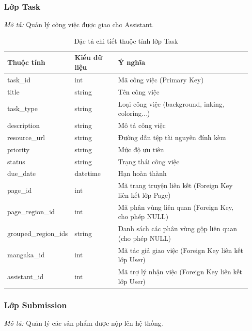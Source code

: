 \subsubsection{Lớp Task}
\textit{Mô tả:} Quản lý công việc được giao cho Assistant.

\begin{table}[H]
\centering
\renewcommand{\arraystretch}{1.3}
\begin{tabularx}{\textwidth}{|p{4cm}|p{3cm}|>{\raggedright\arraybackslash}X|}
\hline
\rowcolor{tableheader}
\textbf{Thuộc tính} & \textbf{Kiểu dữ liệu} & \textbf{Ý nghĩa} \\ \hline
task\_id & int & Mã công việc (Primary Key) \\ \hline
title & string & Tên công việc \\ \hline
task\_type & string & Loại công việc (background, inking, coloring...) \\ \hline
description & string & Mô tả công việc \\ \hline
resource\_url & string & Đường dẫn tệp tài nguyên đính kèm \\ \hline
priority & string & Mức độ ưu tiên \\ \hline
status & string & Trạng thái công việc \\ \hline
due\_date & datetime & Hạn hoàn thành \\ \hline
page\_id & int & Mã trang truyện liên kết (Foreign Key liên kết lớp Page) \\ \hline
page\_region\_id & int & Mã phân vùng liên quan (Foreign Key, cho phép NULL) \\ \hline
grouped\_region\_ids & string & Danh sách các phân vùng gộp liên quan (cho phép NULL) \\ \hline
mangaka\_id & int & Mã tác giả giao việc (Foreign Key liên kết lớp User) \\ \hline
assistant\_id & int & Mã trợ lý nhận việc (Foreign Key liên kết lớp User) \\ \hline
\end{tabularx}
\caption{Đặc tả chi tiết thuộc tính lớp Task}
\label{tab:class_task}
\end{table}


\subsubsection{Lớp Submission}
\textit{Mô tả:} Quản lý các sản phẩm được nộp lên hệ thống.


